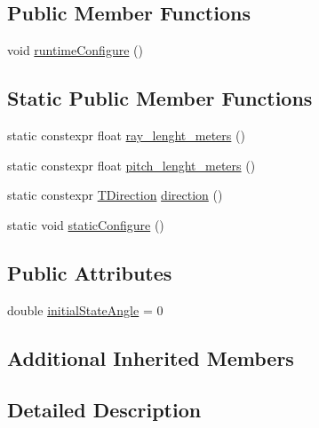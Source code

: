 \subsection*{Public Member Functions}
\begin{DoxyCompactItemize}
\item 
void \hyperlink{structsm__dance__bot__strikes__back_1_1SS4_1_1SsFPattern1_a375b810a59d5791789a249e1904b54f3}{runtime\+Configure} ()
\end{DoxyCompactItemize}
\subsection*{Static Public Member Functions}
\begin{DoxyCompactItemize}
\item 
static constexpr float \hyperlink{structsm__dance__bot__strikes__back_1_1SS4_1_1SsFPattern1_a42e955dfd91252f0785b5e2d28ed5f18}{ray\+\_\+lenght\+\_\+meters} ()
\item 
static constexpr float \hyperlink{structsm__dance__bot__strikes__back_1_1SS4_1_1SsFPattern1_ab98454c837f0c7f01ab14ac30bce718e}{pitch\+\_\+lenght\+\_\+meters} ()
\item 
static constexpr \hyperlink{namespacesm__dance__bot__strikes__back_1_1f__pattern__states_a606b9ab33830b5491413ff90dc1ea1ac}{T\+Direction} \hyperlink{structsm__dance__bot__strikes__back_1_1SS4_1_1SsFPattern1_a268a3bbf45517f3d39de2f81a925bd99}{direction} ()
\item 
static void \hyperlink{structsm__dance__bot__strikes__back_1_1SS4_1_1SsFPattern1_a331cd5ebbb578ed54a7810b957ee5820}{static\+Configure} ()
\end{DoxyCompactItemize}
\subsection*{Public Attributes}
\begin{DoxyCompactItemize}
\item 
double \hyperlink{structsm__dance__bot__strikes__back_1_1SS4_1_1SsFPattern1_a94fb541a6463c594e75459f61583a966}{initial\+State\+Angle} = 0
\end{DoxyCompactItemize}
\subsection*{Additional Inherited Members}


\subsection{Detailed Description}


